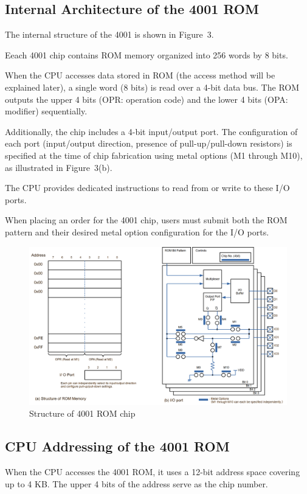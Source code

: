 \subsection{Internal Architecture of the 4001 ROM}
The internal structure of the 4001 is shown in Figure~3.

Eeach 4001 chip contains ROM memory organized into 256 words by 8 bits.

When the CPU accesses data stored in ROM (the access method will be explained later), a single word (8 bits) is read over a 4-bit data bus. The ROM outputs the upper 4 bits (OPR: operation code) and the lower 4 bits (OPA: modifier) sequentially.

Additionally, the chip includes a 4-bit input/output port. The configuration of each port (input/output direction, presence of pull-up/pull-down resistors) is specified at the time of chip fabrication using metal options (M1 through M10), as illustrated in Figure~3(b).

The CPU provides dedicated instructions to read from or write to these I/O ports.

When placing an order for the 4001 chip, users must submit both the ROM pattern and their desired metal option configuration for the I/O ports.

\begin{figure}
    \includegraphics[width=1.0\columnwidth]{./Figure/Structure4001.png}
    \caption{Structure of 4001 ROM chip}
    \label{fig:STRUCTURE4001}
\end{figure}

\subsection{CPU Addressing of the 4001 ROM}
When the CPU accesses the 4001 ROM, it uses a 12-bit address space covering up to 4 KB. The upper 4 bits of the address serve as the chip number.

